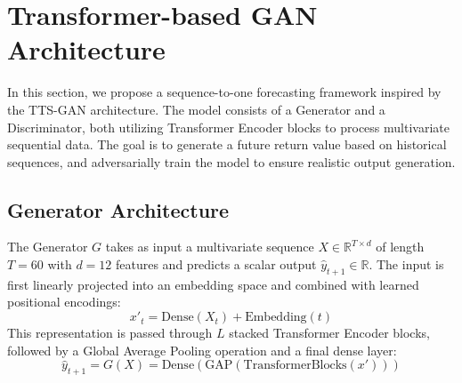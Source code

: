 


\section{Transformer-based GAN Architecture}

In this section, we propose a sequence-to-one forecasting framework inspired by the TTS-GAN architecture. The model consists of a Generator and a Discriminator, both utilizing Transformer Encoder blocks to process multivariate sequential data. The goal is to generate a future return value based on historical sequences, and adversarially train the model to ensure realistic output generation.

\subsection{Generator Architecture}

The Generator $G$ takes as input a multivariate sequence $X \in \mathbb{R}^{T \times d}$ of length $T=60$ with $d=12$ features and predicts a scalar output $\hat{y}_{t+1} \in \mathbb{R}$. The input is first linearly projected into an embedding space and combined with learned positional encodings:
\[
x'_t = \text{Dense}(X_t) + \text{Embedding}(t)
\]
This representation is passed through $L$ stacked Transformer Encoder blocks, followed by a Global Average Pooling operation and a final dense layer:
\[
\hat{y}_{t+1} = G(X) = \text{Dense}(\text{GAP}(\text{TransformerBlocks}(x')))
\]

